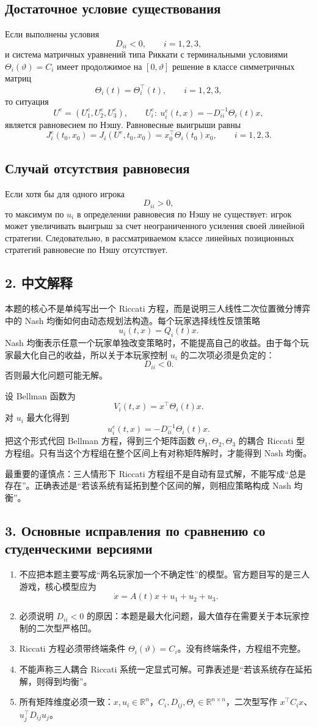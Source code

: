 \documentclass[12pt,a4paper]{article}
\newcommand{\R}{\mathbb{R}}
\newcommand{\cnexplain}{\subsection*{2. 中文解释}}
\newcommand{\corrections}{\subsection*{3. Основные исправления по сравнению со студенческими версиями}}
\begin{document}
\subsection*{Достаточное условие существования}
Если выполнены условия
\[
D_{ii}<0,
\qquad i=1,2,3,
\]
и система матричных уравнений типа Риккати с терминальными условиями \(\Theta_i(\vartheta)=C_i\) имеет продолжимое на \([0,\vartheta]\) решение в классе симметричных матриц
\[
\Theta_i(t)=\Theta_i^{\top}(t),
\qquad i=1,2,3,
\]
то ситуация
\[
U^e=(U_1^e,U_2^e,U_3^e),
\qquad
U_i^e:\ u_i^e(t,x)=-D_{ii}^{-1}\Theta_i(t)x,
\]
является равновесием по Нэшу. Равновесные выигрыши равны
\[
J_i^e(t_0,x_0)=J_i(U^e,t_0,x_0)=x_0^{\top}\Theta_i(t_0)x_0,
\qquad i=1,2,3.
\]

\subsection*{Случай отсутствия равновесия}
Если хотя бы для одного игрока
\[
D_{ii}>0,
\]
то максимум по \(u_i\) в определении равновесия по Нэшу не существует: игрок может увеличивать выигрыш за счет неограниченного усиления своей линейной стратегии. Следовательно, в рассматриваемом классе линейных позиционных стратегий равновесие по Нэшу отсутствует.

\cnexplain
本题的核心不是单纯写出一个 Riccati 方程，而是说明三人线性二次位置微分博弈中的 Nash 均衡如何由动态规划法构造。每个玩家选择线性反馈策略
\[
u_i(t,x)=Q_i(t)x.
\]
Nash 均衡表示任意一个玩家单独改变策略时，不能提高自己的收益。由于每个玩家最大化自己的收益，所以关于本玩家控制 \(u_i\) 的二次项必须是负定的：
\[
D_{ii}<0.
\]
否则最大化问题可能无解。

设 Bellman 函数为
\[
V_i(t,x)=x^{\top}\Theta_i(t)x.
\]
对 \(u_i\) 最大化得到
\[
u_i^e(t,x)=-D_{ii}^{-1}\Theta_i(t)x.
\]
把这个形式代回 Bellman 方程，得到三个矩阵函数 \(\Theta_1,\Theta_2,\Theta_3\) 的耦合 Riccati 型方程组。只有当这个方程组在整个区间上有对称矩阵解时，才能得到 Nash 均衡。

最重要的谨慎点：三人情形下 Riccati 方程组不是自动有显式解，不能写成“总是存在”。正确表述是“若该系统有延拓到整个区间的解，则相应策略构成 Nash 均衡”。

\corrections
\begin{enumerate}
\item 不应把本题主要写成“两名玩家加一个不确定性”的模型。官方题目写的是三人游戏，核心模型应为
\[
\dot x=A(t)x+u_1+u_2+u_3.
\]
\item 必须说明 \(D_{ii}<0\) 的原因：本题是最大化问题，最大值存在需要关于本玩家控制的二次型严格凹。
\item Riccati 方程必须带终端条件 \(\Theta_i(\vartheta)=C_i\)。没有终端条件，方程组不完整。
\item 不能声称三人耦合 Riccati 系统一定显式可解。可靠表述是“若该系统存在延拓解，则得到均衡”。
\item 所有矩阵维度必须一致：\(x,u_i\in\R^n\)，\(C_i,D_{ij},\Theta_i\in\R^{n\times n}\)，二次型写作 \(x^{\top} C_i x\)、\(u_j^{\top} D_{ij}u_j\)。
\end{enumerate}
\end{document}
